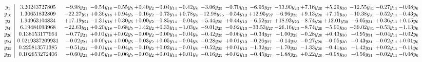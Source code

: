 \documentclass[9pt]{article}
\begin{document}
\[\begin{array}{c| c c@{\hskip 2pt} c@{\hskip 2pt} c@{\hskip 2pt} c@{\hskip 2pt} c@{\hskip 2pt} c@{\hskip 2pt} c@{\hskip 2pt} c@{\hskip 2pt} c@{\hskip 2pt} c@{\hskip 2pt} c@{\hskip 2pt} c@{\hskip 2pt} c@{\hskip 2pt} c@{\hskip 2pt} c@{\hskip 2pt} }
 y_{1}   &  3.20243727805 & -9.98 y_{21} & -0.54 y_{18} & -0.55 y_{5} & +  0.40 y_{2} & -0.04 y_{14} & -0.42 y_{8} & -3.06 y_{25} & -0.70 y_{13} & -6.96 y_{27} & -13.90 y_{23} & +  7.16 y_{20} & +  5.29 y_{30} & -12.55 y_{31} & -0.27 y_{11} & -0.08 y_{6}\\
 y_{16}   &  1.30651832809 & -22.27 y_{21} & +  0.36 y_{18} & +  0.94 y_{5} & -0.16 y_{2} & -0.73 y_{14} & +  0.78 y_{8} & -12.98 y_{25} & -0.54 y_{13} & + 12.95 y_{27} & -6.96 y_{23} & +  9.13 y_{20} & +  7.15 y_{30} & -10.38 y_{31} & -0.52 y_{11} & -0.43 y_{6}\\
 y_{3}   &  1.94963104834 & + 17.19 y_{21} & -1.31 y_{18} & +  0.30 y_{5} & +  0.00 y_{2} & -0.85 y_{14} & -0.04 y_{8} & +  5.44 y_{25} & +  0.44 y_{13} & -6.52 y_{27} & + 18.93 y_{23} & -8.74 y_{20} & + 12.01 y_{30} & -6.05 y_{31} & +  0.36 y_{11} & +  0.15 y_{6}\\
 y_{4}   &  6.19484093968 & -22.63 y_{21} & +  0.20 y_{18} & -0.68 y_{5} & -1.42 y_{2} & +  0.33 y_{14} & -1.03 y_{8} & -9.01 y_{25} & -0.92 y_{13} & -33.53 y_{27} & -26.16 y_{23} & -8.74 y_{20} & -5.90 y_{30} & -39.02 y_{31} & -0.53 y_{11} & -1.13 y_{6}\\
 y_{26}   &  0.138153177664 & -0.77 y_{21} & +  0.01 y_{18} & +  0.02 y_{5} & -0.00 y_{2} & -0.00 y_{14} & -0.04 y_{8} & -0.42 y_{25} & -0.06 y_{13} & -0.34 y_{27} & -1.00 y_{23} & -0.28 y_{20} & +  0.43 y_{30} & -0.95 y_{31} & -0.04 y_{11} & -0.02 y_{6}\\
 y_{24}   &  0.0219337209931 & -0.02 y_{21} & +  0.00 y_{18} & +  0.00 y_{5} & -0.03 y_{2} & +  0.05 y_{14} & -0.04 y_{8} & -0.28 y_{25} & +  0.01 y_{13} & -0.26 y_{27} & -0.14 y_{23} & -0.27 y_{20} & -0.05 y_{30} & -0.43 y_{31} & -0.02 y_{11} & +  0.01 y_{6}\\
 y_{32}   &  0.225813571385 & -0.51 y_{21} & -0.01 y_{18} & -0.04 y_{5} & -0.10 y_{2} & +  0.02 y_{14} & -0.01 y_{8} & -0.52 y_{25} & +  0.01 y_{13} & -1.32 y_{27} & -1.70 y_{23} & -1.33 y_{20} & -0.41 y_{30} & -1.42 y_{31} & +  0.02 y_{11} & -0.11 y_{6}\\
 y_{33}   &  0.102653272406 & -0.60 y_{21} & +  0.05 y_{18} & -0.06 y_{5} & -0.03 y_{2} & +  0.01 y_{14} & +  0.01 y_{8} & -0.16 y_{25} & +  0.02 y_{13} & -0.45 y_{27} & -1.88 y_{23} & +  0.22 y_{20} & -0.98 y_{30} & -0.56 y_{31} & -0.02 y_{11} & -0.08 y_{6}\\

\end{array}\]
\end{document}

